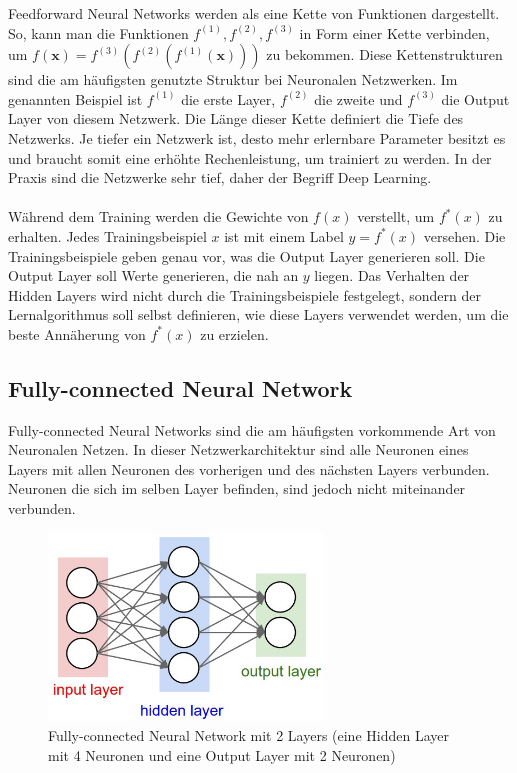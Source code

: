 Feedforward Neural Networks werden als eine Kette von Funktionen dargestellt. So,
kann man die Funktionen $ f^{(1)}, f^{(2)}, f^{(3)} $ in Form einer Kette verbinden, um $ f(\textbf{x}) = f^{(3)}(f^{(2)}(f^{(1)}(\textbf{x}))) $
zu bekommen. Diese Kettenstrukturen sind die am häufigsten genutzte Struktur bei Neuronalen Netzwerken. Im genannten Beispiel ist $ f^{(1)} $ die
erste Layer, $ f^{(2)} $ die zweite und $ f^{(3)} $ die Output Layer von diesem Netzwerk. Die Länge dieser Kette definiert die Tiefe des Netzwerks.
Je tiefer ein Netzwerk ist, desto mehr erlernbare Parameter besitzt es und braucht somit eine erhöhte Rechenleistung, um trainiert zu werden.
In der Praxis sind die Netzwerke sehr tief, daher der Begriff Deep Learning.
\\
\\
Während dem Training werden die Gewichte von $ f(x) $ verstellt, um $ f^*(x) $ zu erhalten. Jedes Trainingsbeispiel $ x $ ist mit einem Label
$ y = f^*(x)$ versehen. Die Trainingsbeispiele geben genau vor, was die Output Layer generieren soll. Die Output Layer soll Werte generieren,
die nah an $ y $ liegen. Das Verhalten der Hidden Layers wird nicht durch die Trainingsbeispiele festgelegt, sondern der Lernalgorithmus
soll selbst definieren, wie diese Layers verwendet werden, um die beste Annäherung von $ f^*(x) $ zu erzielen.

\subsection{Fully-connected Neural Network}
Fully-connected Neural Networks sind die am häufigsten vorkommende Art von Neuronalen Netzen. In dieser Netzwerkarchitektur sind alle Neuronen
eines Layers mit allen Neuronen des vorherigen und des nächsten Layers verbunden. Neuronen die sich im selben Layer befinden,
sind jedoch nicht miteinander verbunden.
\cite{cs231-neural-networks}

\begin{figure}[H]
  \centering
  \includegraphics[width=0.65\textwidth]{resources/nn/neural_net.jpeg}
  \caption{
    Fully-connected Neural Network mit 2 Layers (eine Hidden Layer mit 4 Neuronen und eine Output Layer mit 2 Neuronen)
    \cite{fully-connected-neural-network}
  }
  \label{image:neuronal-network}
\end{figure}

